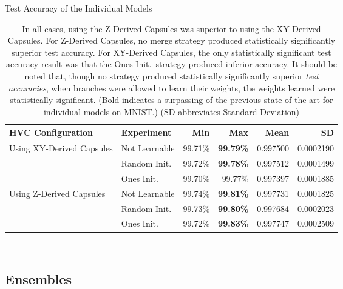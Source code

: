 \documentclass{article}
\begin{document}
\begin{table}[!ht]
  \centering
  \begin{minipage}{\textwidth}
    \caption{Test Accuracy of the Individual Models}
    \begin{tabularx}{\textwidth}{@{}Xlrrrr@{}}
      \toprule
	      HVC Configuration & Experiment & Min & Max & Mean & SD \\
      \midrule
        \multirow{3}{*}{\begin{minipage}{2.5in}Using XY-Derived Capsules\end{minipage}}
	      & Not Learnable & 99.71\% & \textbf{99.79\%} & 0.997500 & 0.0002190 \\
	      & Random Init. & 99.72\% & \textbf{99.78\%} & 0.997512 & 0.0001499 \\
	      & Ones Init. & 99.70\% & 99.77\% & 0.997397 & 0.0001885 \\
      \midrule
        \multirow{3}{*}{\begin{minipage}{2.15in}Using Z-Derived Capsules\end{minipage}}
	      & Not Learnable & 99.74\% & \textbf{99.81\%} & 0.997731 & 0.0001825 \\
	      & Random Init. & 99.73\% & \textbf{99.80\%} & 0.997684 & 0.0002023 \\
	      & Ones Init. & 99.72\% & \textbf{99.83\%} & 0.997747 & 0.0002509 \\
      \bottomrule
    \end{tabularx}\\[0.05in]\label{tab:individual_models}
    \captionsetup{justification=justified,singlelinecheck=false}
    \caption*{In all cases, using the Z-Derived Capsules was superior to using the XY-Derived Capsules.  For Z-Derived Capsules, no merge strategy produced statistically significantly superior test accuracy.  For XY-Derived Capsules, the only statistically significant test accuracy result was that the Ones Init.\ strategy produced inferior accuracy.  It should be noted that, though no strategy produced statistically significantly superior \textit{test accuracies}, when branches were allowed to learn their weights, the weights learned were statistically significant.  (Bold indicates a surpassing of the previous state of the art for individual models on MNIST.)  (SD abbreviates Standard Deviation)}
  \end{minipage}
\end{table}

\subsection{Ensembles}
\end{document}
